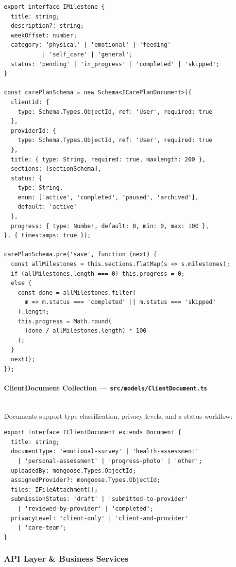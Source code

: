 \documentclass[12pt,letterpaper]{article}
\begin{document}
\begin{lstlisting}[caption={CarePlan model with auto-progress hook (\texttt{CarePlan.ts})}]
export interface IMilestone {
  title: string;
  description?: string;
  weekOffset: number;
  category: 'physical' | 'emotional' | 'feeding'
           | 'self_care' | 'general';
  status: 'pending' | 'in_progress' | 'completed' | 'skipped';
}

const carePlanSchema = new Schema<ICarePlanDocument>({
  clientId: {
    type: Schema.Types.ObjectId, ref: 'User', required: true
  },
  providerId: {
    type: Schema.Types.ObjectId, ref: 'User', required: true
  },
  title: { type: String, required: true, maxlength: 200 },
  sections: [sectionSchema],
  status: {
    type: String,
    enum: ['active', 'completed', 'paused', 'archived'],
    default: 'active'
  },
  progress: { type: Number, default: 0, min: 0, max: 100 },
}, { timestamps: true });

carePlanSchema.pre('save', function (next) {
  const allMilestones = this.sections.flatMap(s => s.milestones);
  if (allMilestones.length === 0) this.progress = 0;
  else {
    const done = allMilestones.filter(
      m => m.status === 'completed' || m.status === 'skipped'
    ).length;
    this.progress = Math.round(
      (done / allMilestones.length) * 100
    );
  }
  next();
});
\end{lstlisting}

\paragraph{ClientDocument Collection --- \texttt{src/models/ClientDocument.ts}}
\mbox{}\\
Documents support type classification, privacy levels, and a status workflow:

\begin{lstlisting}[caption={ClientDocument model (\texttt{ClientDocument.ts})}]
export interface IClientDocument extends Document {
  title: string;
  documentType: 'emotional-survey' | 'health-assessment'
    | 'personal-assessment' | 'progress-photo' | 'other';
  uploadedBy: mongoose.Types.ObjectId;
  assignedProvider?: mongoose.Types.ObjectId;
  files: IFileAttachment[];
  submissionStatus: 'draft' | 'submitted-to-provider'
    | 'reviewed-by-provider' | 'completed';
  privacyLevel: 'client-only' | 'client-and-provider'
    | 'care-team';
}
\end{lstlisting}

\newpage

\subsubsection{API Layer \& Business Services}
\end{document}
